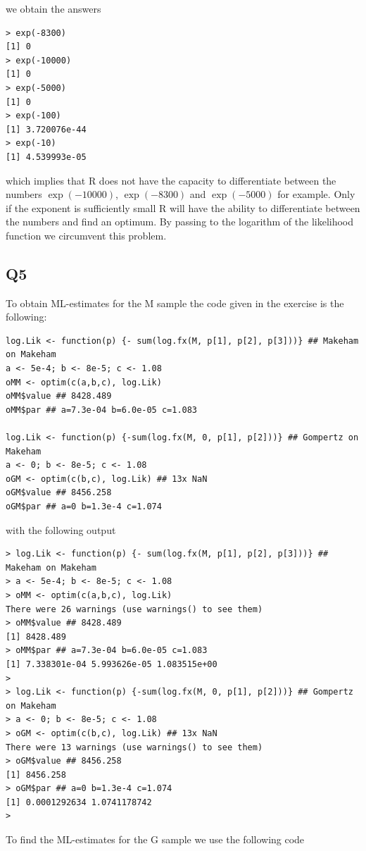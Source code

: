 we obtain the answers

\begin{verbatim}
> exp(-8300)
[1] 0
> exp(-10000)
[1] 0
> exp(-5000)
[1] 0
> exp(-100)
[1] 3.720076e-44
> exp(-10)
[1] 4.539993e-05
\end{verbatim}

which implies that R does not have the capacity to differentiate between the numbers $\exp{(-10000)}$, $\exp{(-8300)}$ and $\exp{(-5000)}$ for example. Only if the exponent is sufficiently small R will have the ability to differentiate between the numbers and find an optimum. By passing to the logarithm of the likelihood function we circumvent this problem. 


\subsection*{Q5}

To obtain ML-estimates for the M sample the code given in the exercise is the following:
\begin{verbatim}
log.Lik <- function(p) {- sum(log.fx(M, p[1], p[2], p[3]))} ## Makeham on Makeham
a <- 5e-4; b <- 8e-5; c <- 1.08
oMM <- optim(c(a,b,c), log.Lik) 
oMM$value ## 8428.489
oMM$par ## a=7.3e-04 b=6.0e-05 c=1.083

log.Lik <- function(p) {-sum(log.fx(M, 0, p[1], p[2]))} ## Gompertz on Makeham
a <- 0; b <- 8e-5; c <- 1.08
oGM <- optim(c(b,c), log.Lik) ## 13x NaN
oGM$value ## 8456.258
oGM$par ## a=0 b=1.3e-4 c=1.074

\end{verbatim}

with the following output

\begin{verbatim}
> log.Lik <- function(p) {- sum(log.fx(M, p[1], p[2], p[3]))} ## Makeham on Makeham
> a <- 5e-4; b <- 8e-5; c <- 1.08
> oMM <- optim(c(a,b,c), log.Lik) 
There were 26 warnings (use warnings() to see them)
> oMM$value ## 8428.489
[1] 8428.489
> oMM$par ## a=7.3e-04 b=6.0e-05 c=1.083
[1] 7.338301e-04 5.993626e-05 1.083515e+00
> 
> log.Lik <- function(p) {-sum(log.fx(M, 0, p[1], p[2]))} ## Gompertz on Makeham
> a <- 0; b <- 8e-5; c <- 1.08
> oGM <- optim(c(b,c), log.Lik) ## 13x NaN
There were 13 warnings (use warnings() to see them)
> oGM$value ## 8456.258
[1] 8456.258
> oGM$par ## a=0 b=1.3e-4 c=1.074
[1] 0.0001292634 1.0741178742
> 
\end{verbatim}

To find the ML-estimates for the G sample we use the following code

